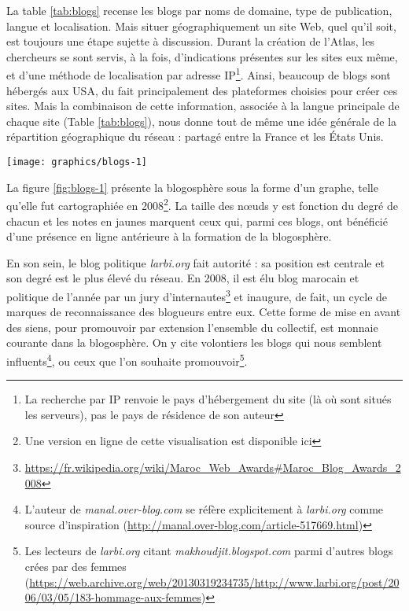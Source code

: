 \documentclass[symmetric,justified,marginals=raggedouter]{tufte-book}
\begin{document}
La table \ref{tab:blogs} recense les blogs par noms de domaine, type de publication, langue et localisation. Mais situer géographiquement un site Web, quel qu'il soit, est toujours une étape sujette à discussion. Durant la création de l'Atlas, les chercheurs se sont servis, à la fois, d'indications présentes sur les sites eux même, et d'une méthode de localisation par adresse IP\footnote{La recherche par IP renvoie le pays d'hébergement du site (là où sont situés les serveurs), pas le pays de résidence de son auteur}. Ainsi, beaucoup de blogs sont hébergés aux USA, du fait principalement des plateformes choisies pour créer ces sites. Mais la combinaison de cette information, associée à la langue principale de chaque site (Table \ref{tab:blogs}), nous donne tout de même une idée générale de la répartition géographique du réseau : partagé entre la France et les États Unis.

\begin{figure*}
  \texttt{[image: graphics/blogs-1]}
  \caption{La blogosphère marocaine en 2008}
  \label{fig:blogs-1}
\end{figure*}

\noindent La figure \ref{fig:blogs-1} présente la blogosphère sous la forme d'un graphe, telle qu'elle fut cartographiée en 2008\footnote{Une version en ligne de cette visualisation est disponible ici}. La taille des nœuds y est fonction du degré de chacun et les notes en jaunes marquent ceux qui, parmi ces blogs, ont bénéficié d'une présence en ligne antérieure à la formation de la blogosphère. 

En son sein, le blog politique \textit{larbi.org} fait autorité : sa position est centrale et son degré est le plus élevé du réseau. En 2008, il est élu blog marocain et politique de l'année par un jury d'internautes\footnote{\url{https://fr.wikipedia.org/wiki/Maroc\_Web\_Awards\#Maroc\_Blog\_Awards\_2008}} et inaugure, de fait, un cycle de marques de reconnaissance des blogueurs entre eux. Cette forme de mise en avant des siens, pour promouvoir par extension l'ensemble du collectif, est monnaie courante dans la blogosphère. On y cite volontiers les blogs qui nous semblent influents\footnote{L'auteur de \textit{manal.over-blog.com} se réfère explicitement à \textit{larbi.org} comme source d'inspiration (\url{http://manal.over-blog.com/article-517669.html})}, ou  ceux que l'on souhaite promouvoir\footnote{Les lecteurs de \textit{larbi.org} citant \textit{makhoudjit.blogspot.com} parmi d'autres blogs crées par des femmes  (\url{https://web.archive.org/web/20130319234735/http://www.larbi.org/post/2006/03/05/183-hommage-aux-femmes})}.
\end{document}
